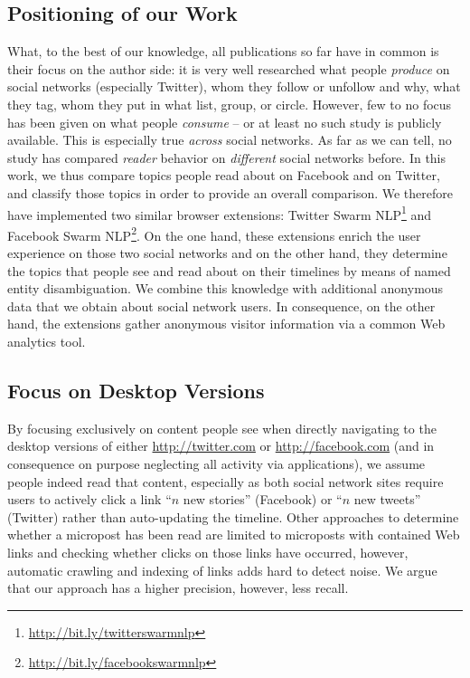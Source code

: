 \documentclass{iosart2c}
\begin{document}
\subsection{Positioning of our Work}
What, to the best of our knowledge, all publications so far have in common is their focus on the author side: it is very well researched what people \emph{produce} on social networks (especially Twitter), whom they follow or unfollow and why, what they tag, whom they put in what list, group, or circle. However, few to no focus has been given on what people \emph{consume} -- or at least no such study is publicly available.
This is especially true \emph{across} social networks.
As far as we can tell, no study has compared \emph{reader} behavior on \emph{different} social networks before.
In this work, we thus compare topics people read about on Facebook and on Twitter, and classify those topics in order to provide an overall comparison. 
We therefore have implemented two similar browser extensions: Twitter Swarm NLP\footnote{\url{http://bit.ly/twitterswarmnlp}} and Facebook Swarm NLP\footnote{\url{http://bit.ly/facebookswarmnlp}}. 
On the one hand, these extensions enrich the user experience on those two social networks and on the other hand, they determine the topics that people see and read about on their timelines by means of named entity disambiguation.
We combine this knowledge with additional anonymous data that we obtain about social network users.
In consequence, on the other hand, the extensions gather anonymous visitor information via a common Web analytics tool.

\subsection{Focus on Desktop Versions}
By focusing exclusively on content people see when directly navigating to the desktop versions of either \url{http://twitter.com} or \url{http://facebook.com} (and in consequence on purpose neglecting all activity via applications), we assume people indeed read that content, especially as both social network sites require users to actively click a link ``$\mathit{n}$ new stories'' (Facebook) or ``$\mathit{n}$ new tweets'' (Twitter) rather than auto-updating the timeline.
Other approaches to determine whether a micropost has been read are limited to microposts with contained Web links and checking whether clicks on those links have occurred, however, automatic crawling and indexing of links adds hard to detect noise.
We argue that our approach has a higher precision, however, less recall.
\end{document}
